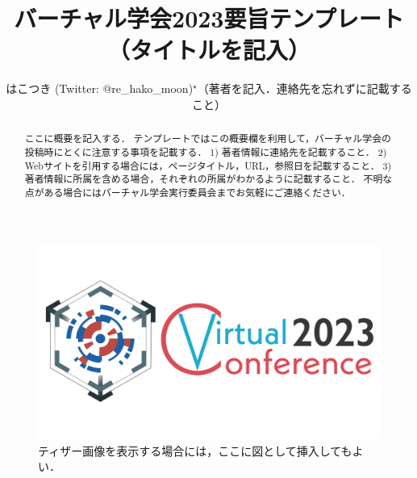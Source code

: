 \documentclass[10pt,a4paper,autodetect-engine,dvipdfmx]{jsarticle} %
\title{バーチャル学会2023要旨テンプレート（タイトルを記入）}
\author{はこつき (Twitter: @re\_hako\_moon)$^\star$（著者を記入．連絡先を忘れずに記載すること）}
\begin{document}
\begin{abstract}
ここに概要を記入する．
テンプレートではこの概要欄を利用して，バーチャル学会の投稿時にとくに注意する事項を記載する．
1) 著者情報に連絡先を記載すること．
2) Webサイトを引用する場合には，ページタイトル，URL，参照日を記載すること．
3) 著者情報に所属を含める場合，それぞれの所属がわかるように記載すること．
不明な点がある場合にはバーチャル学会実行委員会までお気軽にご連絡ください．
\end{abstract}

\maketitle

\begin{figure}[h]
\centering
\includegraphics[width=0.9\linewidth]{vconf2023.png}
\caption{ティザー画像を表示する場合には，ここに図として挿入してもよい．}
\label{fig:topfigure}
\end{figure}
\end{document}
